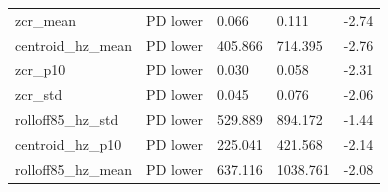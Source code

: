 \documentclass[11pt,a4paper]{article}
\begin{document}
\begin{center}
\begin{longtable}{>{\raggedright\arraybackslash}p{4.20cm}>{\raggedright\arraybackslash}p{2.55cm}>{\raggedleft\arraybackslash}p{2.55cm}>{\raggedleft\arraybackslash}p{2.55cm}>{\raggedleft\arraybackslash}p{2.55cm}}
\hspace{0pt}zcr\_\allowbreak{}mean & \hspace{0pt}PD lower & \hspace{0pt}0.066 & \hspace{0pt}0.111 & \hspace{0pt}-2.74\\
\hspace{0pt}centroid\_\allowbreak{}hz\_\allowbreak{}mean & \hspace{0pt}PD lower & \hspace{0pt}405.866 & \hspace{0pt}714.395 & \hspace{0pt}-2.76\\
\hspace{0pt}zcr\_\allowbreak{}p10 & \hspace{0pt}PD lower & \hspace{0pt}0.030 & \hspace{0pt}0.058 & \hspace{0pt}-2.31\\
\hspace{0pt}zcr\_\allowbreak{}std & \hspace{0pt}PD lower & \hspace{0pt}0.045 & \hspace{0pt}0.076 & \hspace{0pt}-2.06\\
\hspace{0pt}rolloff85\_\allowbreak{}hz\_\allowbreak{}std & \hspace{0pt}PD lower & \hspace{0pt}529.889 & \hspace{0pt}894.172 & \hspace{0pt}-1.44\\
\hspace{0pt}centroid\_\allowbreak{}hz\_\allowbreak{}p10 & \hspace{0pt}PD lower & \hspace{0pt}225.041 & \hspace{0pt}421.568 & \hspace{0pt}-2.14\\
\hspace{0pt}rolloff85\_\allowbreak{}hz\_\allowbreak{}mean & \hspace{0pt}PD lower & \hspace{0pt}637.116 & \hspace{0pt}1038.761 & \hspace{0pt}-2.08\\

\end{longtable}
\end{center}
\end{document}
